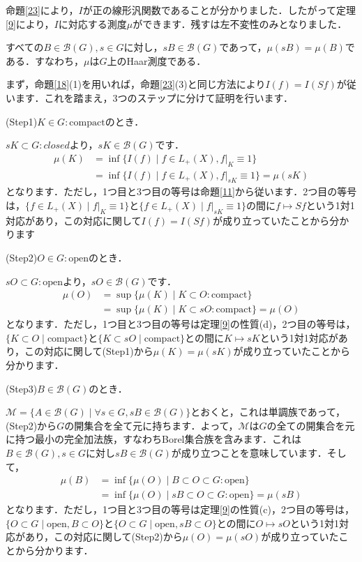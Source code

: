 命題\ref{23}により，$I$が正の線形汎関数であることが分かりました．したがって定理\ref{9}により，$I$に対応する測度$\mu$ができます．残すは左不変性のみとなりました．

\begin{yprop}\label{25}
すべての$B \in \mathscr{B}(G), s \in G$に対し，$sB \in \mathscr{B}(G)$であって，$\mu(sB)=\mu(B)$である．すなわち，$\mu$は$G$上のHaar測度である．
\end{yprop}
\begin{Proof}
まず，命題\ref{18}(1)を用いれば，命題\ref{23}(3)と同じ方法により$I(f)=I(Sf)$が従います．これを踏まえ，3つのステップに分けて証明を行います．

(Step1)$K \in G \colon \mathrm{compact}$のとき．

$sK \subset G \colon closed$より，$sK \in  \mathscr{B}(G)$です．
\begin{align*}
\mu(K) & = \inf \{ I(f) \mid f \in L_{+}(X), f|_{K} \equiv 1 \} \\
 & =\inf \{ I(f) \mid f \in L_{+}(X), f|_{sK} \equiv 1 \}=\mu(sK)
\end{align*}
となります．ただし，1つ目と3つ目の等号は命題\ref{11}から従います．2つ目の等号は，$\{ f \in L_{+}(X) \mid f|_{K} \equiv 1 \}$と$\{ f \in L_{+}(X) \mid f|_{sK} \equiv 1 \}$の間に$f \mapsto Sf$という1対1対応があり，この対応に関して$I(f)=I(Sf)$が成り立っていたことから分かります

(Step2)$O \in G \colon \mathrm{open}$のとき．

$sO \subset G \colon \mathrm{open}$より，$sO \in \mathscr{B}(G)$です．
\begin{align*}
\mu(O) & = \sup \{ \mu(K) \mid K \subset O \colon \mathrm{compact} \} \\
 & =\sup \{ \mu(K) \mid K \subset sO \colon \mathrm{compact} \} = \mu (O)
\end{align*}
となります．ただし，1つ目と3つ目の等号は定理\ref{9}の性質(d)，2つ目の等号は，$\{ K \subset O \mid \mathrm{compact} \}$と$\{ K \subset sO \mid \mathrm{compact} \}$との間に$K \mapsto sK$という1対1対応があり，この対応に関して(Step1)から$\mu(K)=\mu(sK)$が成り立っていたことから分かります．

(Step3)$B \in \mathscr{B}(G)$のとき．

$\mathscr{M}=\{A \in \mathscr{B}(G) \mid \forall s \in G , sB \in \mathscr{B}(G) \}$とおくと，これは単調族であって，(Step2)から$G$の開集合を全て元に持ちます．よって，$\mathscr{M}$は$G$の全ての開集合を元に持つ最小の完全加法族，すなわちBorel集合族を含みます．これは$B \in \mathscr{B}(G), s \in G$に対し$ sB \in \mathscr{B}(G)$が成り立つことを意味しています．そして，
\begin{align*}
\mu(B) & = \inf \{ \mu(O) \mid B \subset O \subset G \colon \mathrm{open}\} \\
 & = \inf \{ \mu(O) \mid sB \subset O \subset G \colon \mathrm{open}\} = \mu(sB)
\end{align*}
となります．ただし，1つ目と3つ目の等号は定理\ref{9}の性質(c)，2つ目の等号は，$\{ O \subset G \mid \mathrm{open}, B \subset O \}$と$\{ O \subset G \mid \mathrm{open}, sB \subset O \}$との間に$O \mapsto sO$という1対1対応があり，この対応に関して(Step2)から$\mu(O)=\mu(sO)$が成り立っていたことから分かります．


\end{Proof}
